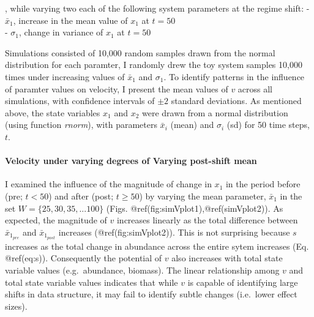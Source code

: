 \documentclass[]{article}
\let\oldparagraph\paragraph
\renewcommand{\paragraph}[1]{\oldparagraph{#1}\mbox{}}
\begin{document}
, while varying two each of the following system parameters at the
regime shift: - \(\bar{x}_1\), increase in the mean value of \(x_1\) at
\(t=50\)\\
- \(\sigma_1\), change in variance of \(x_1\) at \(t=50\)

Simulations consisted of 10,000 random samples drawn from the normal
distribution for each paramter, I randomly drew the toy system samples
10,000 times under increasing values of \(\bar{x}_1\) and \(\sigma_1\).
To identify patterns in the influence of paramter values on velocity, I
present the mean values of \(v\) across all simulations, with confidence
intervals of \(\pm 2\) standard deviations. As mentioned above, the
state variables \(x_1\) and \(x_2\) were drawn from a normal
distribution (using function \emph{rnorm}), with parameters
\(\bar{x}_i\) (mean) and \(\sigma_i\) (sd) for 50 time steps, \(t\).

\hypertarget{velocity-under-varying-degrees-of-varying-post-shift-mean}{%
\paragraph{Velocity under varying degrees of Varying post-shift
mean}\label{velocity-under-varying-degrees-of-varying-post-shift-mean}}

I examined the influence of the magnitude of change in \(x_1\) in the
period before (pre; \(t <50\)) and after (post; \(t \geq 50\)) by
varying the mean parameter, \(\bar{x}_1\) in the set
\(W=\{25,30,35,...100 \}\) (Figs. @ref(fig:simVplot1),@ref(simVplot2)).
As expected, the magnitude of \(v\) increases linearly as the total
difference between \(\bar{x}_{1_{pre}}\) and \(\bar{x}_{1_{post}}\)
increases (@ref(fig:simVplot2)). This is not surprising because \(s\)
increases as the total change in abundance across the entire sytem
increases (Eq. @ref(eq:s)). Consequently the potential of \(v\) also
increases with total state variable values (e.g.~abundance, biomass).
The linear relationship among \(v\) and total state variable values
indicates that while \(v\) is capable of identifying large shifts in
data structure, it may fail to identify subtle changes (i.e.~lower
effect sizes).
\end{document}
